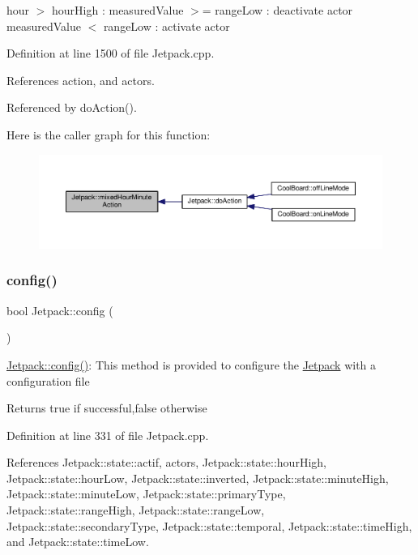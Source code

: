 hour $>$ hour\+High \+: measured\+Value $>$= range\+Low \+: deactivate actor measured\+Value $<$ range\+Low \+: activate actor 

Definition at line 1500 of file Jetpack.\+cpp.



References action, and actors.



Referenced by do\+Action().

Here is the caller graph for this function\+:
\nopagebreak
\begin{figure}[H]
\begin{center}
\leavevmode
\includegraphics[width=350pt]{df/d1d/class_jetpack_a273dae1517b56f0242e28b8944edc26b_icgraph}
\end{center}
\end{figure}
\mbox{\label{class_jetpack_ab065ee83e244265a2223a22f3ee4a719}} 
\subsubsection{\texorpdfstring{config()}{config()}}
{\footnotesize\ttfamily bool Jetpack\+::config (\begin{DoxyParamCaption}{ }\end{DoxyParamCaption})}

\hyperlink{class_jetpack_ab065ee83e244265a2223a22f3ee4a719}{Jetpack\+::config()}\+: This method is provided to configure the \hyperlink{class_jetpack}{Jetpack} with a configuration file

\begin{DoxyReturn}{Returns}
true if successful,false otherwise 
\end{DoxyReturn}


Definition at line 331 of file Jetpack.\+cpp.



References Jetpack\+::state\+::actif, actors, Jetpack\+::state\+::hour\+High, Jetpack\+::state\+::hour\+Low, Jetpack\+::state\+::inverted, Jetpack\+::state\+::minute\+High, Jetpack\+::state\+::minute\+Low, Jetpack\+::state\+::primary\+Type, Jetpack\+::state\+::range\+High, Jetpack\+::state\+::range\+Low, Jetpack\+::state\+::secondary\+Type, Jetpack\+::state\+::temporal, Jetpack\+::state\+::time\+High, and Jetpack\+::state\+::time\+Low.



